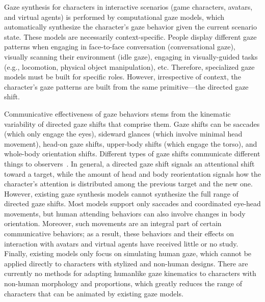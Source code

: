 Gaze synthesis for characters in interactive scenarios (game characters, avatars, and virtual agents) is performed by computational gaze models, which automatically synthesize the character's gaze behavior given the current scenario state.
These models are necessarily context-specific. People display different gaze patterns when engaging in face-to-face conversation (conversational gaze), visually scanning their environment (idle gaze), engaging in visually-guided tasks (e.g., locomotion, physical object manipulation), etc. Therefore, specialized gaze models must be built for specific roles.
However, irrespective of context, the character's gaze patterns are built from the same primitive---the directed gaze shift.

Communicative effectiveness of gaze behaviors stems from the kinematic variability of directed gaze shifts that comprise them. Gaze shifts can be saccades (which only engage the eyes), sideward glances (which involve minimal head movement), head-on gaze shifts, upper-body shifts (which engage the torso), and whole-body orientation shifts. Different types of gaze shifts communicate different things to observers~\citep{langton2000eyes}. In general, a directed gaze shift signals an attentional shift toward a target, while the amount of head and body reorientation signals how the character's attention is distributed among the previous target and the new one.
However, existing gaze synthesis models cannot synthesize the full range of directed gaze shifts. Most models support only saccades and coordinated eye-head movements, but human attending behaviors can also involve changes in body orientation. Moreover, such movements are an integral part of certain communicative behaviors; as a result, these behaviors and their effects on interaction with avatars and virtual agents have received little or no study. Finally, existing models only focus on simulating human gaze, which cannot be applied directly to characters with stylized and non-human designs. There are currently no methods for adapting humanlike gaze kinematics to characters with non-human morphology and proportions, which greatly reduces the range of characters that can be animated by existing gaze models.

